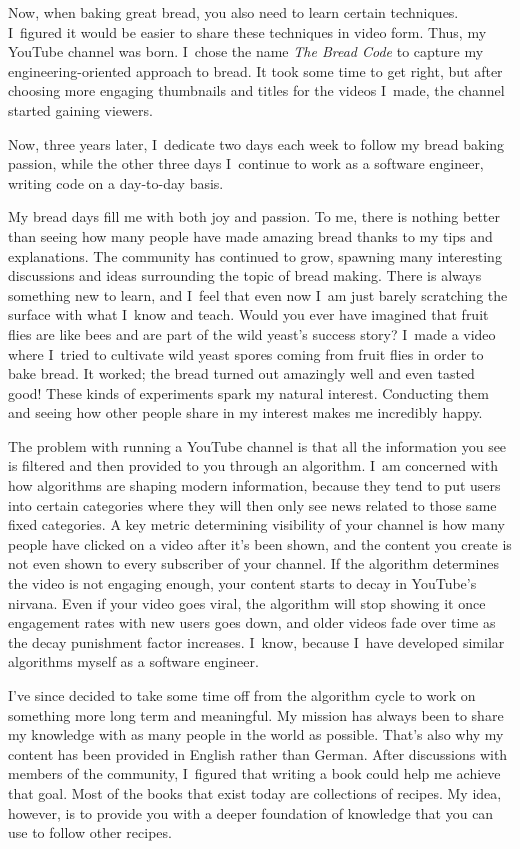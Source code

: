 Now, when baking great bread, you also need to learn certain techniques. I~figured it would be
easier to share these techniques in video form. Thus, my YouTube channel was born. I~chose
the name \emph{The Bread Code} to capture my engineering-oriented approach to bread. It took some
time to get right, but after choosing more engaging thumbnails and titles for
the videos I~made, the channel started gaining viewers.

Now, three years later, I~dedicate two days each week to follow my bread baking passion, while
the other three days I~continue to work as a software engineer, writing code on a day-to-day
basis.

My bread days fill me with both joy and passion. To me, there is nothing better than seeing
how many people have made amazing bread thanks to my tips and explanations. The community has
continued to grow, spawning many interesting discussions and ideas surrounding the topic of
bread making. There is always something new to learn, and I~feel that even now I~am just barely
scratching the surface with what I~know and teach. Would you ever have imagined that fruit
flies are like bees and are part of the wild yeast's success story? I~made a video where
I~tried to cultivate wild yeast spores coming from fruit flies in order
to bake bread. It worked; the bread turned out amazingly well and even tasted good! These kinds of
experiments spark my natural interest. Conducting them and seeing how other people share in my
interest makes me incredibly happy.

The problem with running a YouTube channel is that all the information
you see is filtered and then provided to you through an algorithm. I~am concerned
with how algorithms are shaping modern information, because they tend to
put users into certain categories where they will then only see news related to
those same fixed categories. A key metric determining visibility of your channel is how many
people have clicked on a video after it's been shown, and the content you create
is not even shown to every subscriber of your channel. If the algorithm determines the video
is not engaging enough, your content starts to decay in YouTube's nirvana. Even if your video
goes viral, the algorithm will stop showing it once engagement rates with new users goes down,
and older videos fade over time as the decay punishment factor increases. I~know, because
I~have developed similar algorithms myself as a software engineer.

I've since decided to take some time off from the algorithm cycle to work on something more
long term and meaningful. My mission has always been to share my knowledge with as many people
in the world as possible. That's also why my content has been provided in English rather than
German. After discussions with members of the community, I~figured that writing a book could
help me achieve that goal. Most of the books that exist today are collections of recipes. My
idea, however, is to provide you with a deeper foundation of knowledge that you can use to
follow other recipes.


